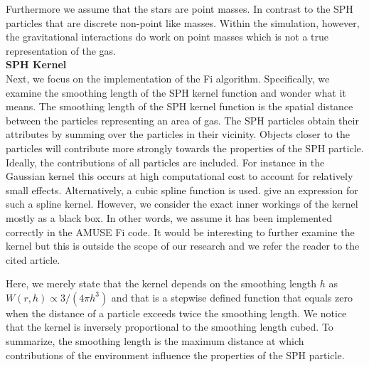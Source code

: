 \documentclass{aa}
\begin{document}
Furthermore we assume that the stars are point masses. In contrast to the SPH particles that are discrete non-point like masses. Within the simulation, however, the gravitational interactions do work on point masses which is not a true representation of the gas. \\

\noindent \textbf{SPH Kernel} \\
Next, we focus on the implementation of the Fi algorithm. Specifically, we examine the smoothing length of the SPH kernel function and wonder what it means. The smoothing length of the SPH kernel function is the spatial distance between the particles representing an area of gas. The SPH particles obtain their attributes by summing over the particles in their vicinity. Objects closer to the particles will contribute more strongly towards the properties of the SPH particle. Ideally, the contributions of all particles are included. For instance in the Gaussian kernel this occurs at high computational cost to account for relatively small effects. Alternatively, a cubic spline function is used. \cite{1985A&A...149..135M} give an expression for such a spline kernel. However, we consider the exact inner workings of the kernel mostly as a black box. In other words, we assume it has been implemented correctly in the AMUSE Fi code. It would be interesting to further examine the kernel but this is outside the scope of our research and we refer the reader to the cited article. 

Here, we merely state that the kernel depends on the smoothing length $h$ as $W(r,h) \propto 3/(4\pi h^3)$ and that is a stepwise defined function that equals zero when the distance of a particle exceeds twice the smoothing length. We notice that the kernel is inversely proportional to the smoothing length cubed. To summarize, the smoothing length is the maximum distance at which contributions of the environment influence the properties of the SPH particle.
\end{document}
